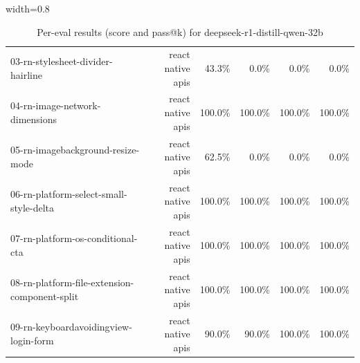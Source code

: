 \begin{table}[htbp]
\begin{adjustbox}{width=0.8\textwidth}
\begin{tabular}{lrrrrr}
03-rn-stylesheet-divider-hairline & react native apis & 43.3\% & 0.0\% & 0.0\% & 0.0\% \\
04-rn-image-network-dimensions & react native apis & 100.0\% & 100.0\% & 100.0\% & 100.0\% \\
05-rn-imagebackground-resize-mode & react native apis & 62.5\% & 0.0\% & 0.0\% & 0.0\% \\
06-rn-platform-select-small-style-delta & react native apis & 100.0\% & 100.0\% & 100.0\% & 100.0\% \\
07-rn-platform-os-conditional-cta & react native apis & 100.0\% & 100.0\% & 100.0\% & 100.0\% \\
08-rn-platform-file-extension-component-split & react native apis & 100.0\% & 100.0\% & 100.0\% & 100.0\% \\
09-rn-keyboardavoidingview-login-form & react native apis & 90.0\% & 90.0\% & 100.0\% & 100.0\% \\
\bottomrule
\end{tabular}
\end{adjustbox}
\caption{Per-eval results (score and pass@k) for deepseek-r1-distill-qwen-32b}
\end{table}
